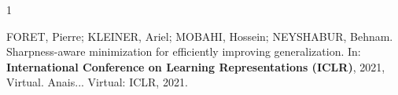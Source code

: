 \documentclass[12pt, a4paper]{article}
\begin{document}
\begin{thebibliography}{1}

 FORET, Pierre; KLEINER, Ariel; MOBAHI, Hossein; NEYSHABUR, Behnam. Sharpness-aware minimization for efficiently improving generalization. In: \textbf{International Conference on Learning Representations (ICLR)}, 2021, Virtual. Anais... Virtual: ICLR, 2021.

\end{thebibliography}
\end{document}
